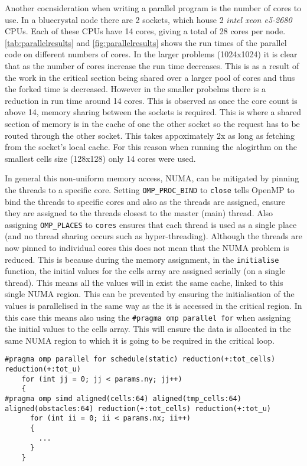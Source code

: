 \documentclass{article}
\begin{document}
\begin{multicols}{2}
Another cocnsideration when writing a parallel program is the number of cores
to use. In a bluecrystal node there are 2 sockets, which house 2 \emph{intel
xeon e5-2680} CPUs. Each of these CPUs have 14 cores, giving a total of 28
cores per node. \autoref{tab:parallelresults} and \autoref{fig:parallelresults}
shows the run times of the parallel code on different numbers of cores. In the
larger problems (1024x1024) it is clear that as the number of cores increase
the run time decreases. This is as a result of the work in the critical section
being shared over a larger pool of cores and thus the forked time is decreased.
However in the smaller probelms there is a reduction in run time around 14
cores. This is observed as once the core count is above 14, memory sharing
between the sockets is required. This is where a shared section of memory is in
the cache of one the other socket so the request has to be routed through the
other socket. This takes appoximately 2x as long as fetching from the socket's
local cache. For this reason when running the alogirthm on the smallest cells
size (128x128) only 14 cores were used.

In general this non-uniform memory access, NUMA, can be mitigated by pinning 
the threads to a specific core. Setting \verb|OMP_PROC_BIND| to \verb|close|
tells OpenMP to bind the threads to specific cores and also as the threads are
assigned, ensure they are assigned to the threads closest to the master (main)
thread. Also assigning \verb|OMP_PLACES| to \verb|cores| ensures that each
thread is used as a single place (and no thread sharing occurs such as
hyper-threading). Although the threads are now pinned to individual cores this
does not mean that the NUMA problem is reduced. This is because during the
memory assignment, in the \verb|initialise| function, the initial values for the
cells array are assigned serially (on a single thread). This means all the
values will in exist the same cache, linked to this single NUMA region. This
can be prevented by ensuring the initialisation of the values is parallelised
in the same way as the it is accessed in the critical region. In this case this
means also using the \verb|#pragma omp parallel for| when assigning the initial
values to the cells array. This will ensure the data is allocated in the same
NUMA region to which it is going to be required in the critical loop.

\begin{lstlisting}[style=CStyle, label={lst:ompparallelloop}, caption={TODO},]
#pragma omp parallel for schedule(static) reduction(+:tot_cells) reduction(+:tot_u)
    for (int jj = 0; jj < params.ny; jj++)
    {    
#pragma omp simd aligned(cells:64) aligned(tmp_cells:64) aligned(obstacles:64) reduction(+:tot_cells) reduction(+:tot_u)
      for (int ii = 0; ii < params.nx; ii++)
      {
        ...
      }
    }
\end{lstlisting}


\end{multicols}
\end{document}

